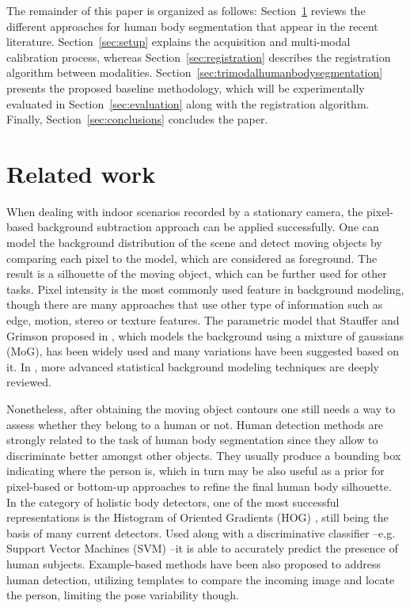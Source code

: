 \documentclass[10pt,twocolumn,letterpaper]{article}
\begin{document}
The remainder of this paper is organized as follows: Section~\ref{sec:relatedwork} reviews the different approaches for human body segmentation that appear in the recent literature. Section~\ref{sec:setup} explains the acquisition and multi-modal calibration process, whereas Section~\ref{sec:registration} describes the registration algorithm between modalities. Section~\ref{sec:trimodalhumanbodysegmentation} presents the proposed baseline methodology, which will be experimentally evaluated in Section~\ref{sec:evaluation} along with the registration algorithm. Finally, Section~\ref{sec:conclusions} concludes the paper.

\section{Related work}
\label{sec:relatedwork}
 
 When dealing with indoor scenarios recorded by a stationary camera, the pixel-based background subtraction approach can be applied successfully. One can model the background distribution of the scene and detect moving objects by comparing each pixel to the model, which are considered as foreground. The result is a silhouette of the moving object, which can be further used for other tasks. Pixel intensity is the most commonly used feature in background modeling, though there are many approaches that use other type of information such as edge, motion, stereo or texture features. The parametric model that Stauffer and Grimson proposed in \cite{stauffer1999adaptive}, which models the background using a mixture of gaussians (MoG), has been widely used and many variations have been suggested based on it. In \cite{bouwmans2011recent}, more advanced statistical background modeling techniques are deeply reviewed. 
 
Nonetheless, after obtaining the moving object contours one still needs a way to assess whether they belong to a human or not. Human detection methods are strongly related to the task of human body segmentation since they allow to discriminate better amongst other objects. They usually produce a bounding box indicating where the person is, which in turn may be also useful as a prior for pixel-based or bottom-up approaches to refine the final human body silhouette. In the category of holistic body detectors, one of the most successful representations is the Histogram of Oriented Gradients (HOG) \cite{dalal2005histograms}, still being the basis of many current detectors. Used along with a discriminative classifier --e.g. Support Vector Machines (SVM) \cite{hearst1998support} --it is able to accurately predict the presence of human subjects. Example-based methods \cite{andriluka2010monocular} have been also proposed to address human detection, utilizing templates to compare the incoming image and locate the person, limiting the pose variability though.  
\end{document}
